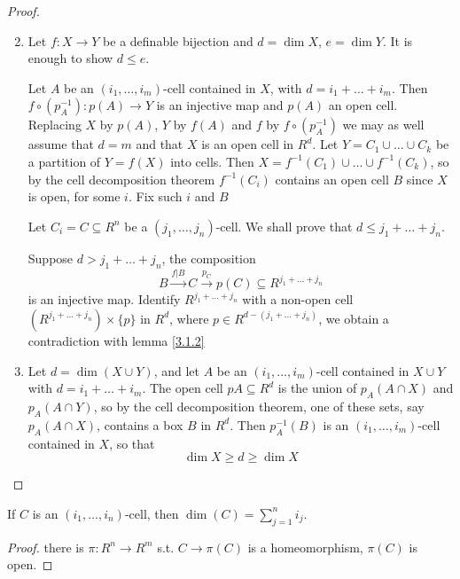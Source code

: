 \documentclass[11pt]{article}
\begin{document}
\begin{proof}
\begin{enumerate}
\setcounter{enumi}{1}
\item Let \(f:X\to Y\) be a definable bijection and \(d=\dim X\), \(e=\dim Y\). It is enough to
show \(d\le e\).

Let \(A\) be an \((i_1,\dots,i_m)\)-cell contained in \(X\), with \(d=i_1+\dots+i_m\).
Then \(f\circ(p_A^{-1}):p(A)\to Y\) is an injective map and \(p(A)\) an open cell.
Replacing \(X\) by \(p(A)\), \(Y\) by \(f(A)\) and \(f\) by \(f\circ(p_A^{-1})\) we may as well
assume that \(d=m\) and that \(X\) is an open cell in \(R^d\). Let \(Y=C_1\cup\dots\cup C_k\) be a
partition of \(Y=f(X)\) into cells. Then \(X=f^{-1}(C_1)\cup\dots\cup f^{-1}(C_k)\), so by the cell
decomposition theorem  \(f^{-1}(C_i)\) contains an open cell \(B\) since \(X\) is open, for
some \(i\). Fix such \(i\) and \(B\)

Let \(C_i=C\subseteq R^n\) be a \((j_1,\dots,j_n)\)-cell. We shall prove that \(d\le j_1+\dots+j_n\).

Suppose \(d>j_1+\dots+j_n\), the composition
\begin{equation*}
B\xrightarrow{f|B}C\xrightarrow{p_C}p(C)\subseteq R^{j_1+\dots+j_n}
\end{equation*}
is an injective map. Identify \(R^{j_1+\dots+j_n}\) with a non-open cell \((R^{j_1+\dots+j_n})\times\{p\}\)
in \(R^d\), where \(p\in R^{d-(j_1+\dots+j_n)}\), we obtain a contradiction with lemma \ref{3.1.2}
\item Let \(d=\dim(X\cup Y)\), and let \(A\) be an \((i_1,\dots,i_m)\)-cell contained in \(X\cup Y\)
with \(d=i_1+\dots+i_m\). The open cell \(pA\subseteq R^d\) is the union of \(p_A(A\cap X)\)
and \(p_A(A\cap Y)\), so by the cell decomposition theorem, one of these sets,
say \(p_A(A\cap X)\), contains a box \(B\) in \(R^d\). Then \(p_A^{-1}(B)\) is
an \((i_1,\dots,i_m)\)-cell contained in \(X\), so that
\begin{equation*}
\dim X\ge d\ge \dim X
\end{equation*}
\end{enumerate}
\end{proof}

\begin{theorem}[]
If \(C\) is an \((i_1,\dots,i_n)\)-cell, then \(\dim(C)=\sum_{j=1}^ni_j\).
\end{theorem}

\begin{proof}
there is \(\pi:R^n\to R^m\) s.t. \(C\to\pi(C)\) is a homeomorphism, \(\pi(C)\) is open.
\end{proof}
\end{document}
